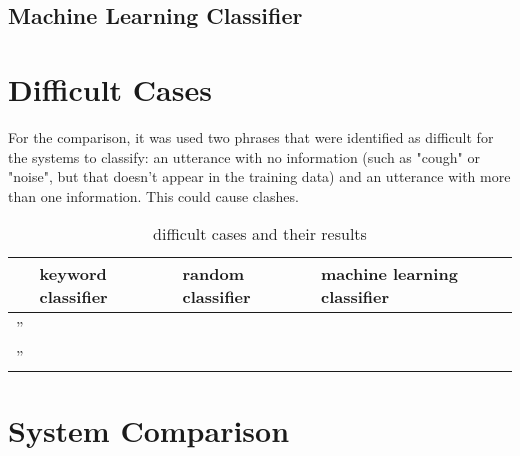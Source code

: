 \documentclass[a4paper]{article}
\begin{document}
\subsection{Machine Learning Classifier}
\label{ml}


\section{Difficult Cases}

For the comparison, it was used two phrases that were identified as difficult for the systems to classify: an utterance with no information (such as "cough" or "noise", but that doesn't appear in the training data) and an utterance with more than one information. This could cause clashes.


\begin{table}[h!]
    \centering
    \begin{tabular}{l|l|l|l}
      & keyword classifier & random classifier & machine learning classifier \\ \hline
     '' & & & \\ \hline
     '' & & & \\
    \end{tabular}
    \caption{difficult cases and their results}
    \label{table4}
\end{table}{}

\section{System Comparison}
\end{document}
